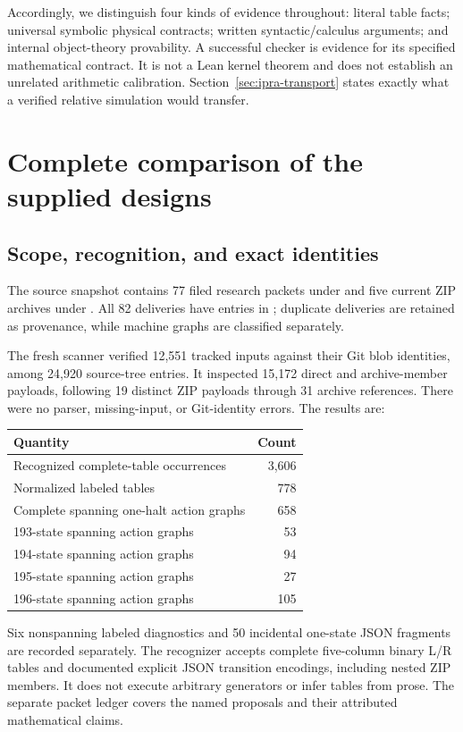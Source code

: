 \documentclass[11pt]{article}
\theoremstyle{definition}\newtheorem{definition}[theorem]{Definition}
\begin{document}
Accordingly, we distinguish four kinds of evidence throughout:
literal table facts; universal symbolic physical contracts; written
syntactic/calculus arguments; and internal object-theory provability.
A successful checker is evidence for its specified mathematical contract.
It is not a Lean kernel theorem and does not establish an unrelated
arithmetic calibration. Section~\ref{sec:ipra-transport} states exactly
what a verified relative simulation would transfer.

\section{Complete comparison of the supplied designs}
\label{sec:comparison}

\subsection{Scope, recognition, and exact identities}

The source snapshot contains 77 filed research packets under
 and five current ZIP
archives under . All 82 deliveries have entries in
; duplicate deliveries are retained
as provenance, while machine graphs are classified separately.

The fresh scanner verified 12,551 tracked inputs against their Git blob
identities, among 24,920 source-tree entries. It inspected 15,172 direct
and archive-member payloads, following 19 distinct ZIP payloads through
31 archive references. There were no parser, missing-input, or Git-identity
errors. The results are:
\begin{center}
\begin{tabular}{lr}
\toprule Quantity & Count\\\midrule
Recognized complete-table occurrences & 3,606\\
Normalized labeled tables & 778\\
Complete spanning one-halt action graphs & 658\\
193-state spanning action graphs & 53\\
194-state spanning action graphs & 94\\
195-state spanning action graphs & 27\\
196-state spanning action graphs & 105\\
\bottomrule
\end{tabular}
\end{center}
Six nonspanning labeled diagnostics and 50 incidental one-state JSON
fragments are recorded separately. The recognizer accepts complete
five-column binary L/R tables and documented explicit JSON transition
encodings, including nested ZIP members. It does not execute arbitrary
generators or infer tables from prose. The separate packet ledger covers
the named proposals and their attributed mathematical claims.
\end{document}
